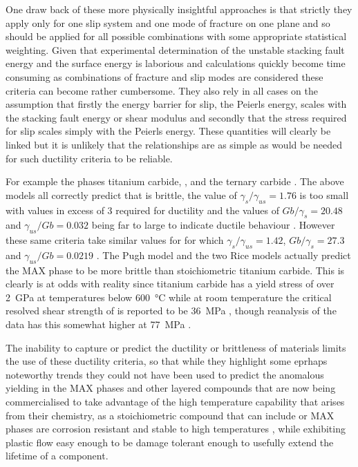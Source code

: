 One draw back of these more physically insightful approaches is that strictly they apply only for one slip system and one mode of fracture on one plane and so should be applied for all possible combinations with some appropriate statistical weighting. Given that experimental determination of the unstable stacking fault energy and the surface energy is laborious and calculations quickly become time consuming as combinations of fracture and slip modes are considered these criteria can become rather cumbersome. They also rely in all cases on the assumption that firstly the energy barrier for slip, the Peierls energy, scales with the stacking fault energy or shear modulus and secondly that the stress required for slip scales simply with the Peierls energy. These quantities will clearly be linked but it is unlikely that the relationships are as simple as would be needed for such ductility criteria to be reliable.

For example the phases titanium carbide, , and the ternary carbide . The above models all correctly predict that  is brittle, the value of $\gamma_s / \gamma_{us} = 1.76$ is too small with values in excess of 3 required for ductility \cite{Price1992,Yu2003} and the values of $Gb/\gamma_s = 20.48$ and $\gamma_{us} / Gb = 0.032$ being far to large to indicate ductile behaviour \cite{Yu2003,Medvedeva2011}. However these same criteria take similar values for  for which $\gamma_s / \gamma_{us} = 1.42$, $Gb/\gamma_s = 27.3$ and $\gamma_{us} / Gb = 0.0219$ \cite{Medvedeva2011,Farle2015}. The Pugh model and the two Rice models \cite{Pugh1954,rice1974,Rice1992} actually predict the MAX phase to be more brittle than stoichiometric titanium carbide. This is clearly is at odds with reality since titanium carbide has a yield stress of over \SI{2}{\giga\pascal} at temperatures below \SI{600}{\celsius} \cite{Miracle1983} while at room temperature the critical resolved shear strength of  is reported to be \SI{36}{\mega\pascal} \cite{Barsoum1999}, though reanalysis of the data has this somewhat higher at \SI{77}{\mega\pascal} \cite{Humphrey2012}.


The inability to capture or predict the ductility or brittleness of materials limits the use of these ductility criteria, so that while they highlight some eprhaps noteworthy trends they could not have been used to predict the anomalous yielding in the MAX phases and other layered compounds that are now being commercialised to take advantage of the high temperature capability that arises from their chemistry, as a stoichiometric compound that can include  or  MAX phases are corrosion resistant and stable to high temperatures \cite{Radovic2013}, while exhibiting plastic flow easy enough to be damage tolerant enough to usefully extend the lifetime of a component.

